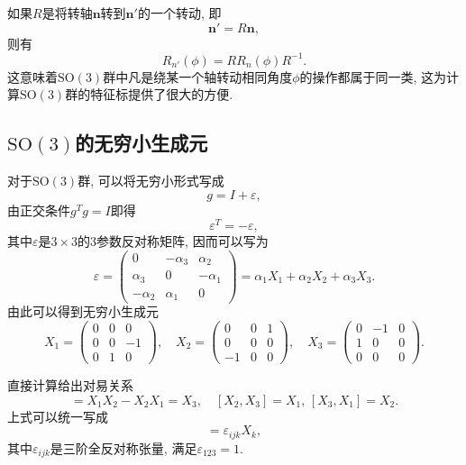 \documentclass[UTF8]{ctexart}
\begin{document}
如果$R$是将转轴$\bm{n}$转到$\bm{n}'$的一个转动, 即
\begin{equation}
  \bm{n}' = R \bm{n}, 
\end{equation}
则有
\begin{equation}
  R_{n'}(\phi) = R R_n(\phi) R^{-1}.
\end{equation}
这意味着$\mathrm{SO}(3)$群中凡是绕某一个轴转动相同角度$\phi$的操作都属于同一类, 这为计算$\mathrm{SO}(3)$群的特征标提供了很大的方便.

\subsection{$\mathrm{SO}(3)$的无穷小生成元}
对于$\mathrm{SO}(3)$群, 可以将无穷小形式写成
\begin{equation}
  g = I + \varepsilon,
\end{equation}
由正交条件$g^Tg = I$即得
\begin{equation}
  \varepsilon^T = - \varepsilon, 
\end{equation}
其中$\varepsilon$是$3 \times 3$的3参数反对称矩阵, 因而可以写为
\begin{equation}
  \varepsilon =
  \begin{pmatrix}
    0 & -\alpha_3 & \alpha_2 \\
    \alpha_3 & 0 & -\alpha_1 \\
    -\alpha_2 & \alpha_1 & 0
  \end{pmatrix} = \alpha_1 X_1 + \alpha_2 X_2 + \alpha_3 X_3.
\end{equation}
由此可以得到无穷小生成元
\begin{equation}
  X_1 =
  \begin{pmatrix}
    0 & 0 & 0 \\
    0 & 0 & -1 \\
    0 & 1 & 0
  \end{pmatrix}, \quad X_2 =
  \begin{pmatrix}
    0 & 0 & 1 \\
    0 & 0 & 0 \\
    -1 & 0 & 0 
  \end{pmatrix}, \quad X_3 =
  \begin{pmatrix}
    0 & -1 & 0 \\
    1 & 0 & 0 \\
    0 & 0 & 0
  \end{pmatrix}.
\end{equation}

直接计算给出对易关系
\begin{equation}
  [X_1, X_2] = X_1 X_2 - X_2 X_1 = X_3, \quad [X_2,X_3]=X_1, \, [X_3,X_1] = X_2.
\end{equation}
上式可以统一写成
\begin{equation}
  [X_i,X_j] = \varepsilon_{ijk}X_k,
\end{equation}
其中$\varepsilon_{ijk}$是三阶全反对称张量, 满足$\varepsilon_{123} = 1$.
\end{document}
